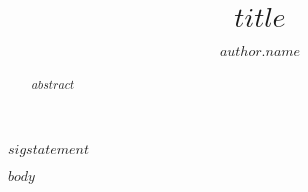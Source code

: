 \documentclass{biophys-new}
\title{$title$}
\author[$author.id$]{$author.name$}
\affil[$affil.id$]{$affil.affiliation$}
\begin{document}
\begin{frontmatter}

\begin{abstract}
$abstract$
\end{abstract}

\begin{sigstatement}
$sigstatement$
\end{sigstatement}
\end{frontmatter}

$body$
\end{document}
